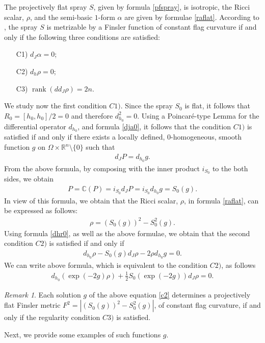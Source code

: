 \documentclass[oneside,english]{amsart}
\numberwithin{equation}{section}
\numberwithin{figure}{section}
\theoremstyle{plain}
\theoremstyle{plain}
\theoremstyle{definition}
\theoremstyle{plain}
\theoremstyle{plain}
\theoremstyle{plain}
\theoremstyle{remark}
\newtheorem{rem}[thm]{Remark}
\theoremstyle{remark}
\begin{document}
The projectively flat spray $S$, given by formula \eqref{pfspray}, is
isotropic, the Ricci scalar, $\rho$, and the semi-basic $1$-form
$\alpha$ are given by formulae \eqref{raflat}.
According to \cite[Thm. 4.1]{BM13}, the spray $S$ is metrizable by a Finsler function of
constant flag curvature if and only if the following three conditions are
satisfied:
\begin{itemize}
\item[C1)] $d_J\alpha=0$;
\item[C2)] $d_h\rho=0$;
\item[C3)] $\operatorname{rank}(dd_J\rho)=2n$.
\end{itemize}
We study now the first condition $C1)$. Since the spray $S_0$ is flat, it
follows that $R_0=[h_0,h_0]/2=0$ and therefore $d^2_{h_0}=0$. Using a
Poincar\'e-type Lemma for the differential operator $d_{h_0}$, and formula
\eqref{dja0}, it follows that the condition $C1)$ is satisfied if and only if
there exists a locally defined, $0$-homogeneous, smooth function $g$ on
$\Omega \times \mathbb{R}^n\setminus\{0\}$ such that
\begin{eqnarray}
  d_JP=d_{h_0}g. \label{c1}\end{eqnarray}
From the above formula, by composing with the inner product $i_{S_0}$
to the both sides, we obtain 
\begin{eqnarray}
  P=\mathbb{C}(P)=i_{S_0}d_JP=i_{S_0}d_{h_0}g=S_0(g). \label{psog} \end{eqnarray}
In view of this formula, we obtain that the Ricci scalar, $\rho$, in
formula \eqref{raflat}, can be expressed as follows:
\begin{eqnarray}
  \rho = \left(S_0(g)\right)^2 - S^2_0(g). \label{rhosog} \end{eqnarray} 
Using formula \eqref{dhr0}, as well as the above formulae, we obtain that the second condition $C2)$
is satisfied if and only if 
\begin{eqnarray*}
  d_{h_0}\rho - S_0(g) d_J\rho - 2\rho d_{h_0}g=0. \end{eqnarray*}
We can write above formula, which is equivalent to the condition $C2)$,
as follows
\begin{eqnarray}
  d_{h_0}(\exp(-2g)\rho)+\frac{1}{2}
  S_0(\exp(-2g))d_J\rho=0. \label{c2} \end{eqnarray}
\begin{rem} \label{h4eqcc} Each solution $g$ of the above equation \eqref{c2}
  determines a projectively flat Finsler metric
  $F^2=\left|\left(S_0(g)\right)^2 - S^2_0(g)\right|$, of constant
  flag curvature, if and only if the regularity condition $C3)$ is
  satisfied. \end{rem} Next, we provide some examples of such
functions $g$. 
\end{document}
